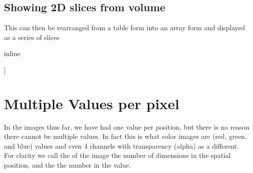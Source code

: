 \documentclass[letterpaper,10pt,english]{sphinxmanual}
\begin{document}
\subsection{Showing 2D slices from volume}
\label{\detokenize{01-Introduction:showing-2d-slices-from-volume}}
\sphinxAtStartPar
This can then be rearranged from a table form into an array form and displayed as a series of slices

\begin{sphinxVerbatim}[commandchars=\\\{\}]
 inline
   
     
   
      
\end{sphinxVerbatim}

\begin{sphinxVerbatim}[commandchars=\\\{\}]
[[ 0  1  2  9 10 11]
 [ 3  4  5 12 13 14]
 [ 6  7  8 15 16 17]
 [18 19 20  0  0  0]
 [21 22 23  0  0  0]
 [24 25 26  0  0  0]]
\end{sphinxVerbatim}

\noindent{}


\section{Multiple Values per pixel}
\label{\detokenize{01-Introduction:multiple-values-per-pixel}}
\sphinxAtStartPar
In the images thus far, we have had one value per position, but there is no reason there cannot be multiple values. In fact this is what color images are (red, green, and blue) values and even 4 channels with transparency (alpha) as a different. For clarity we call the  of the image the number of dimensions in the spatial position, and the  the number in the value.
\end{document}
